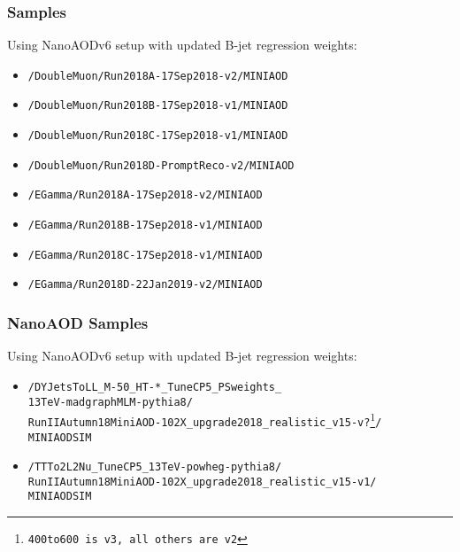 \documentclass{beamer}
\begin{document}
\begin{frame}
  \frametitle{Samples}

  Using NanoAODv6 setup with updated B-jet regression weights:

  \begin{itemize}
  \item \texttt{\small /DoubleMuon/Run2018A-17Sep2018-v2/MINIAOD}
  \item \texttt{\small /DoubleMuon/Run2018B-17Sep2018-v1/MINIAOD}
  \item \texttt{\small /DoubleMuon/Run2018C-17Sep2018-v1/MINIAOD}
  \item \texttt{\small /DoubleMuon/Run2018D-PromptReco-v2/MINIAOD}
  \item \texttt{\small /EGamma/Run2018A-17Sep2018-v2/MINIAOD}
  \item \texttt{\small /EGamma/Run2018B-17Sep2018-v1/MINIAOD}
  \item \texttt{\small /EGamma/Run2018C-17Sep2018-v1/MINIAOD}
  \item \texttt{\small /EGamma/Run2018D-22Jan2019-v2/MINIAOD}
  \end{itemize}

\end{frame}


\begin{frame}
  \frametitle{NanoAOD Samples}

  Using NanoAODv6 setup with updated B-jet regression weights:

  \begin{itemize}
  \item \texttt{\small /DYJetsToLL\_M-50\_HT-*\_TuneCP5\_PSweights\_\\13TeV-madgraphMLM-pythia8/\\RunIIAutumn18MiniAOD-102X\_upgrade2018\_realistic\_v15-v?\footnote{400to600 is v3, all others are v2}/\\MINIAODSIM}
  \item \texttt{\small /TTTo2L2Nu\_TuneCP5\_13TeV-powheg-pythia8/\\RunIIAutumn18MiniAOD-102X\_upgrade2018\_realistic\_v15-v1/\\MINIAODSIM}
  \end{itemize}

\end{frame}
\end{document}
